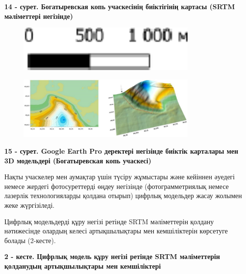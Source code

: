 {\bfseries 14 - сурет. Богатыревская копь учаскесінің биіктігінің картасы (SRTM мәліметтері негізінде)}

\begin{figure}[H]
	\centering
	\includegraphics[width=0.8\textwidth]{media/ict2/image209}
	\caption*{}
\end{figure}

\begin{figure}[H]
	\centering
	\includegraphics[width=0.8\textwidth]{media/ict2/image218}
	\caption*{}
\end{figure}

{\bfseries 15 - сурет. Google Earth Pro деректері негізінде биіктік карталары мен 3D модельдері (Богатыревская копь учаскесі)}

Нақты учаскелер мен аумақтар үшін түсіру жұмыстары және кейіннен әуедегі
немесе жердегі фотосуреттерді өңдеу негізінде (фотограмметриялық немесе
лазерлік технологияларды қолдана отырып) цифрлық модельдер жасау жолымен
жеке жүргізіледі.

Цифрлық модельдерді құру негізі ретінде SRTM мәліметтерін қолдану
нәтижесінде олардың келесі артықшылықтары мен кемшіліктерін көрсетуге
болады (2-кесте).

{\bfseries 2 - кесте. Цифрлық модель құру негізі ретінде SRTM мәліметтерін қолданудың артықшылықтары мен кемшіліктері}

